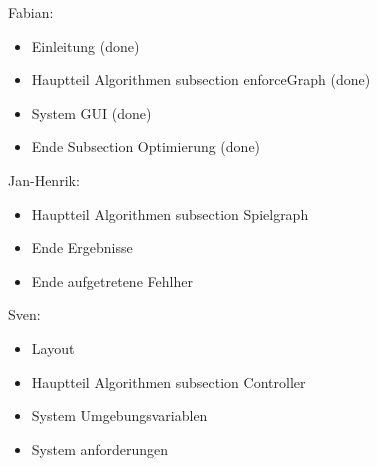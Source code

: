 Fabian:
\begin{itemize}
	\item Einleitung (done)
	\item Hauptteil Algorithmen subsection enforceGraph (done)
	\item System GUI (done)
	\item Ende Subsection Optimierung (done)
\end{itemize}
Jan-Henrik:
\begin{itemize}
	\item Hauptteil Algorithmen subsection Spielgraph
	\item Ende Ergebnisse
	\item Ende aufgetretene Fehlher
\end{itemize}
Sven:
\begin{itemize}
	\item Layout
	\item Hauptteil Algorithmen subsection Controller
	\item System Umgebungsvariablen
	\item System anforderungen
\end{itemize}
